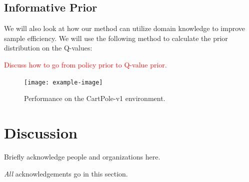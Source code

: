 \documentclass[]{uai2021} %
\begin{document}
\subsection{Informative Prior}
We will also look at how our method can utilize domain knowledge to improve sample efficiency. We will use the following method to calculate the prior distribution on the Q-values:

\textcolor{red}{Discuss how to go from policy prior to Q-value prior.}

\begin{figure}
    \texttt{[image: example-image]}
    \caption{Performance on the CartPole-v1 environment.}
\end{figure}

\section{Discussion}


\begin{acknowledgements} %
    Briefly acknowledge people and organizations here.

    \emph{All} acknowledgements go in this section.
\end{acknowledgements}



\appendix
\end{document}
